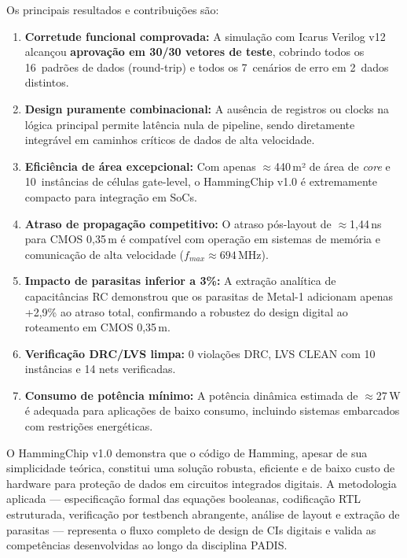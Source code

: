 \documentclass[12pt,a4paper]{article}
\begin{document}
Os principais resultados e contribuições são:

\begin{enumerate}[leftmargin=2em,label=\textbf{\arabic*.}]
  \item \textbf{Corretude funcional comprovada:} A simulação com Icarus Verilog v12 alcançou \textbf{aprovação em 30/30 vetores de teste}, cobrindo todos os 16~padrões de dados (round-trip) e todos os 7~cenários de erro em 2~dados distintos.

  \item \textbf{Design puramente combinacional:} A ausência de registros ou clocks na lógica principal permite latência nula de pipeline, sendo diretamente integrável em caminhos críticos de dados de alta velocidade.

  \item \textbf{Eficiência de área excepcional:} Com apenas $\approx$440\,\textmu m² de área de \textit{core} e 10~instâncias de células gate-level, o HammingChip v1.0 é extremamente compacto para integração em SoCs.

  \item \textbf{Atraso de propagação competitivo:} O atraso pós-layout de $\approx$1,44\,ns para CMOS 0,35\,\textmu m é compatível com operação em sistemas de memória e comunicação de alta velocidade ($f_{max} \approx 694$\,MHz).

  \item \textbf{Impacto de parasitas inferior a 3\%:} A extração analítica de capacitâncias RC demonstrou que os parasitas de Metal-1 adicionam apenas +2,9\% ao atraso total, confirmando a robustez do design digital ao roteamento em CMOS 0,35\,\textmu m.

  \item \textbf{Verificação DRC/LVS limpa:} 0 violações DRC, LVS CLEAN com 10 instâncias e 14 nets verificadas.

  \item \textbf{Consumo de potência mínimo:} A potência dinâmica estimada de $\approx$27\,\textmu W é adequada para aplicações de baixo consumo, incluindo sistemas embarcados com restrições energéticas.
\end{enumerate}

O HammingChip v1.0 demonstra que o código de Hamming, apesar de sua simplicidade teórica, constitui uma solução robusta, eficiente e de baixo custo de hardware para proteção de dados em circuitos integrados digitais. A metodologia aplicada --- especificação formal das equações booleanas, codificação RTL estruturada, verificação por testbench abrangente, análise de layout e extração de parasitas --- representa o fluxo completo de design de CIs digitais e valida as competências desenvolvidas ao longo da disciplina PADIS.
\end{document}
